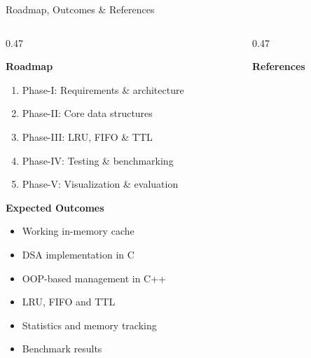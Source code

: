 \documentclass[aspectratio=169,10pt]{beamer}
\begin{document}
\begin{frame}
{Roadmap, Outcomes \& References}

\begin{columns}[T]

\begin{column}{0.47\textwidth}

\textbf{\color{GEUBlue}Roadmap}

\begin{enumerate}

\item Phase-I: Requirements \& architecture

\item Phase-II: Core data structures

\item Phase-III: LRU, FIFO \& TTL

\item Phase-IV: Testing \& benchmarking

\item Phase-V: Visualization \& evaluation

\end{enumerate}

\vspace{3mm}

\textbf{\color{GEUBlue}Expected Outcomes}

\begin{itemize}

\item Working in-memory cache

\item DSA implementation in C

\item OOP-based management in C++

\item LRU, FIFO and TTL

\item Statistics and memory tracking

\item Benchmark results

\end{itemize}

\end{column}

\begin{column}{0.47\textwidth}

\textbf{\color{GEUBlue}References}

\begin{enumerate}


\end{enumerate}
\end{column}
\end{columns}
\end{frame}
\end{document}
